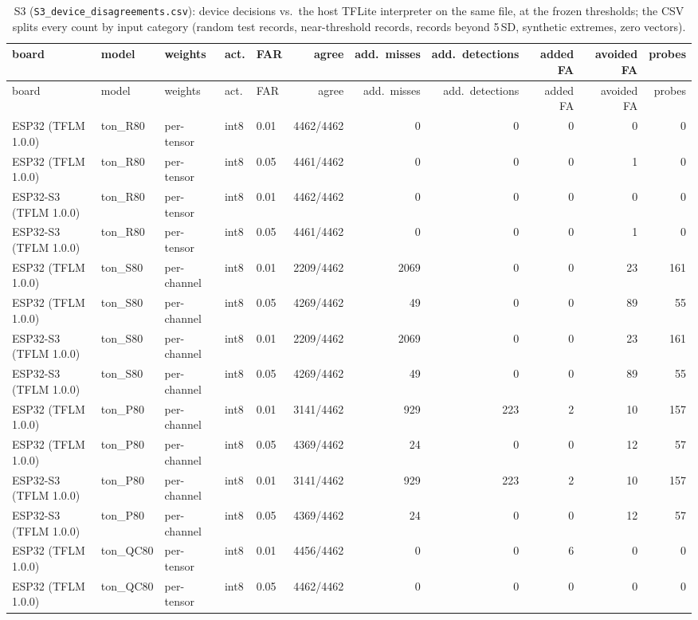 \documentclass[10pt]{article}
\begin{document}
{\tiny
\begin{longtable}{lllllrrrrrr}
\caption{S3 (\texttt{S3\_device\_disagreements.csv}): device decisions vs.\ the host TFLite interpreter on the same file, at the frozen thresholds; the CSV splits every count by input category (random test records, near-threshold records, records beyond 5\,SD, synthetic extremes, zero vectors).}\\
\toprule
board & model & weights & act. & FAR & agree & add.\ misses & add.\ detections & added FA & avoided FA & probes \\
\midrule
\endfirsthead
\toprule
board & model & weights & act. & FAR & agree & add.\ misses & add.\ detections & added FA & avoided FA & probes \\
\midrule
\endhead
\bottomrule
\endlastfoot
ESP32 (TFLM 1.0.0) & ton\_R80 & per-tensor & int8 & 0.01 & 4462/4462 & 0 & 0 & 0 & 0 & 0 \\
ESP32 (TFLM 1.0.0) & ton\_R80 & per-tensor & int8 & 0.05 & 4461/4462 & 0 & 0 & 0 & 1 & 0 \\
ESP32-S3 (TFLM 1.0.0) & ton\_R80 & per-tensor & int8 & 0.01 & 4462/4462 & 0 & 0 & 0 & 0 & 0 \\
ESP32-S3 (TFLM 1.0.0) & ton\_R80 & per-tensor & int8 & 0.05 & 4461/4462 & 0 & 0 & 0 & 1 & 0 \\
ESP32 (TFLM 1.0.0) & ton\_S80 & per-channel & int8 & 0.01 & 2209/4462 & 2069 & 0 & 0 & 23 & 161 \\
ESP32 (TFLM 1.0.0) & ton\_S80 & per-channel & int8 & 0.05 & 4269/4462 & 49 & 0 & 0 & 89 & 55 \\
ESP32-S3 (TFLM 1.0.0) & ton\_S80 & per-channel & int8 & 0.01 & 2209/4462 & 2069 & 0 & 0 & 23 & 161 \\
ESP32-S3 (TFLM 1.0.0) & ton\_S80 & per-channel & int8 & 0.05 & 4269/4462 & 49 & 0 & 0 & 89 & 55 \\
ESP32 (TFLM 1.0.0) & ton\_P80 & per-channel & int8 & 0.01 & 3141/4462 & 929 & 223 & 2 & 10 & 157 \\
ESP32 (TFLM 1.0.0) & ton\_P80 & per-channel & int8 & 0.05 & 4369/4462 & 24 & 0 & 0 & 12 & 57 \\
ESP32-S3 (TFLM 1.0.0) & ton\_P80 & per-channel & int8 & 0.01 & 3141/4462 & 929 & 223 & 2 & 10 & 157 \\
ESP32-S3 (TFLM 1.0.0) & ton\_P80 & per-channel & int8 & 0.05 & 4369/4462 & 24 & 0 & 0 & 12 & 57 \\
ESP32 (TFLM 1.0.0) & ton\_QC80 & per-tensor & int8 & 0.01 & 4456/4462 & 0 & 0 & 6 & 0 & 0 \\
ESP32 (TFLM 1.0.0) & ton\_QC80 & per-tensor & int8 & 0.05 & 4462/4462 & 0 & 0 & 0 & 0 & 0 \\

\end{longtable}}
\end{document}
